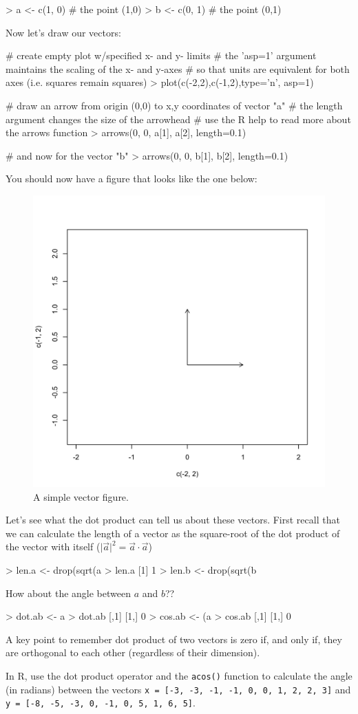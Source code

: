\begin{R}
> a <- c(1, 0) # the point (1,0)
> b <- c(0, 1) # the point (0,1)    
\end{R}
%
Now let's draw our vectors:
%
\begin{R}
# create empty plot w/specified x- and y- limits
# the 'asp=1' argument maintains the scaling of the x- and y-axes
# so that units are equivalent for both axes (i.e. squares remain squares)
> plot(c(-2,2),c(-1,2),type='n', asp=1) 

# draw an arrow from origin (0,0) to x,y coordinates of vector "a"
# the length argument changes the size of the arrowhead
# use the R help to read more about the arrows function
> arrows(0, 0, a[1], a[2], length=0.1) 

# and now for the vector "b"
> arrows(0, 0, b[1], b[2], length=0.1)
\end{R}
%
You should now have a figure that looks like the one below:
\begin{figure}[htbp]
\centering
\includegraphics[width=0.33\columnwidth]{./figures/hands-on2/rightangle.pdf}
\caption{A simple vector figure.}
\end{figure}
%
Let's see what the dot product can tell us about these vectors. First recall that we can calculate the length of a vector as the square-root of the dot product of the vector with itself ($\vert\vec{a}\vert^2  =  \vec{a} \cdot \vec{a}$)
\begin{R}
> len.a <- drop(sqrt(a %
> len.a
[1] 1
> len.b <- drop(sqrt(b %
\end{R}
%
How about the angle between $a$ and $b$??
\begin{R}
> dot.ab <- a %
> dot.ab
     [,1]
[1,]    0
> cos.ab <- (a %
> cos.ab  
     [,1]
[1,]    0
\end{R}     
A key point to remember dot product of two vectors is zero if, and only if, they are orthogonal to each other (regardless of their dimension).


\begin{assignment}
In R, use the dot product operator and the
\lstinline!acos()! function to calculate the angle (in radians) between
the vectors \lstinline!x = [-3, -3, -1, -1, 0, 0, 1, 2, 2, 3]! and
\lstinline!y = [-8, -5, -3, 0, -1, 0, 5, 1, 6, 5]!.
\end{assignment}

